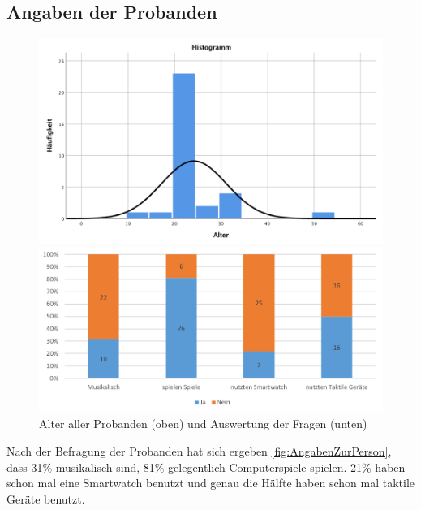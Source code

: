 
\subsection{Angaben der Probanden}

\begin{figure}[htbp] 
	\centering
	\begin{minipage}[t]{0.8\textwidth}
		\includegraphics[width=\textwidth]{pics/analyse/person/alter.png}
	\end{minipage}
	\begin{minipage}[t]{0.8\textwidth}
		\includegraphics[width=\textwidth]{pics/analyse/person/questions.png}
	\end{minipage}
	\caption{Alter aller Probanden (oben) und Auswertung der Fragen (unten)}
	\label{fig:AngabenZurPerson}
\end{figure}

Nach der Befragung der Probanden hat sich ergeben \autoref{fig:AngabenZurPerson}, dass 31\% musikalisch sind, 81\% gelegentlich Computerspiele spielen. 21\% haben schon mal eine Smartwatch benutzt und genau die H{\"a}lfte haben schon mal taktile Ger{\"a}te benutzt. 

